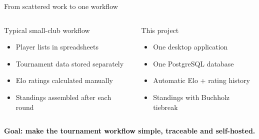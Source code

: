 \documentclass[aspectratio=169,11pt]{beamer}
\newcommand{\bigidea}[1]{\begin{center}\color{thgablue}\bfseries\Large #1\end{center}}
\begin{document}
\begin{frame}{From scattered work to one workflow}
\vspace{0.15cm}
\begin{columns}[T,onlytextwidth]
    \begin{block}{Typical small-club workflow}
      \vspace{0.15cm}
      \begin{itemize}\setlength\itemsep{0.45em}
        \item Player lists in spreadsheets
        \item Tournament data stored separately
        \item Elo ratings calculated manually
        \item Standings assembled after each round
      \end{itemize}
      \vspace{0.05cm}
    \end{block}
    \begin{block}{This project}
      \vspace{0.15cm}
      \begin{itemize}\setlength\itemsep{0.45em}
        \item One desktop application
        \item One PostgreSQL database
        \item Automatic Elo + rating history
        \item Standings with Buchholz tiebreak
      \end{itemize}
      \vspace{0.05cm}
    \end{block}
\end{columns}
\vspace{0.4cm}
\bigidea{Goal: make the tournament workflow simple, traceable and self-hosted.}
\end{frame}
\end{document}
